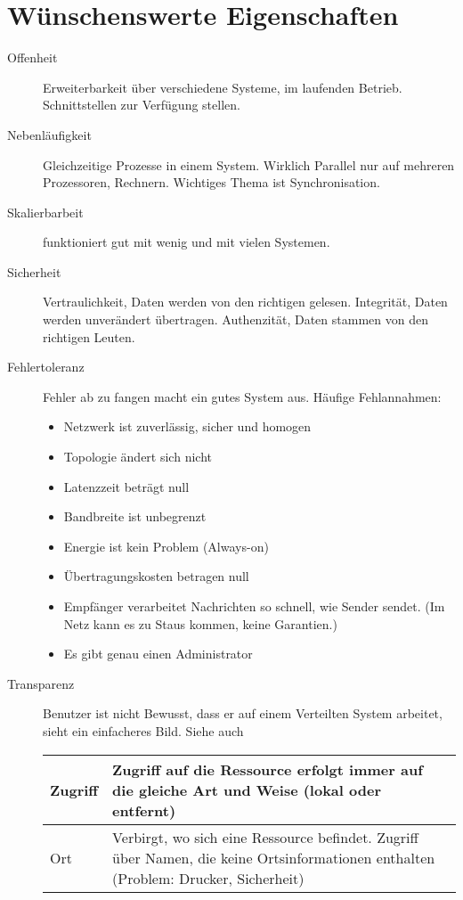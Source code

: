 \section{Wünschenswerte Eigenschaften}
\begin{description}
	\item[Offenheit] Erweiterbarkeit über verschiedene Systeme, im laufenden Betrieb. Schnittstellen zur Verfügung stellen.
	\item[Nebenläufigkeit] Gleichzeitige Prozesse in einem System. Wirklich Parallel nur auf mehreren Prozessoren, Rechnern. Wichtiges Thema ist Synchronisation.
	\item[Skalierbarbeit] funktioniert gut mit wenig und mit vielen Systemen. 
	\item[Sicherheit] Vertraulichkeit, Daten werden von den richtigen gelesen. Integrität, Daten werden unverändert übertragen. Authenzität, Daten stammen von den richtigen Leuten.
	\item[Fehlertoleranz] Fehler ab zu fangen macht ein gutes System aus. Häufige Fehlannahmen:
		\begin{itemize}
			\item Netzwerk ist zuverlässig, sicher und homogen
			\item Topologie ändert sich nicht
			\item Latenzzeit beträgt null
			\item Bandbreite ist unbegrenzt
			\item Energie ist kein Problem (Always-on)
			\item Übertragungskosten betragen null
			\item Empfänger verarbeitet Nachrichten so schnell, wie Sender sendet. (Im Netz kann es zu Staus kommen, keine Garantien.)
			\item Es gibt genau einen Administrator
		\end{itemize}
	\item[Transparenz] Benutzer ist nicht Bewusst, dass er auf einem Verteilten System arbeitet, sieht ein einfacheres Bild. Siehe auch 
		\begin{table}[h]
			\begin{tabular}{ l |  p{11cm} }
				Zugriff & Zugriff auf die Ressource erfolgt immer auf die gleiche Art und Weise (lokal oder entfernt) \\ \hline
				Ort & Verbirgt, wo sich eine Ressource befindet. Zugriff über Namen, die keine Ortsinformationen enthalten (Problem: Drucker, Sicherheit) \\ \hline

\end{tabular}
\end{table}
\end{description}
